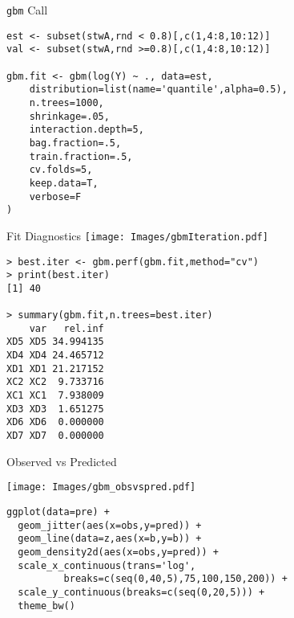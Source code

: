 \documentclass{beamer}
\begin{document}
\begin{frame}[fragile]{\texttt{gbm} Call}
\scriptsize
\begin{verbatim}
est <- subset(stwA,rnd < 0.8)[,c(1,4:8,10:12)]
val <- subset(stwA,rnd >=0.8)[,c(1,4:8,10:12)]

gbm.fit <- gbm(log(Y) ~ ., data=est,
    distribution=list(name='quantile',alpha=0.5),
    n.trees=1000,
    shrinkage=.05,
    interaction.depth=5,
    bag.fraction=.5,
    train.fraction=.5,
    cv.folds=5,
    keep.data=T,
    verbose=F
)
\end{verbatim}
\normalsize
\end{frame}

\begin{frame}[fragile]{Fit Diagnostics}
\texttt{[image: Images/gbmIteration.pdf]}
\end{frame}


\begin{frame}[fragile]{}
\scriptsize
\begin{verbatim}
> best.iter <- gbm.perf(gbm.fit,method="cv")
> print(best.iter)
[1] 40

> summary(gbm.fit,n.trees=best.iter)
    var   rel.inf
XD5 XD5 34.994135
XD4 XD4 24.465712
XD1 XD1 21.217152
XC2 XC2  9.733716
XC1 XC1  7.938009
XD3 XD3  1.651275
XD6 XD6  0.000000
XD7 XD7  0.000000
\end{verbatim}
\normalsize
\end{frame}


\begin{frame}[fragile]{Observed vs Predicted}
\begin{centering}
\texttt{[image: Images/gbm\_obsvspred.pdf]}
\end{centering}
\end{frame}


\begin{frame}[fragile]{}
\scriptsize
\begin{verbatim}
ggplot(data=pre) + 
  geom_jitter(aes(x=obs,y=pred)) + 
  geom_line(data=z,aes(x=b,y=b)) +
  geom_density2d(aes(x=obs,y=pred)) +
  scale_x_continuous(trans='log', 
          breaks=c(seq(0,40,5),75,100,150,200)) +
  scale_y_continuous(breaks=c(seq(0,20,5))) +
  theme_bw()
\end{verbatim}
\normalsize
\end{frame}
\end{document}
